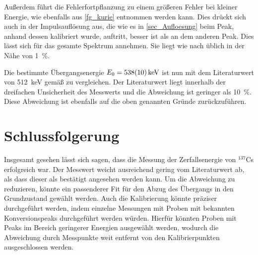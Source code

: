 \documentclass[
	a4paper,
	12pt,
	pagesize,
	ngerman
]{scrartcl}
\begin{document}
	Außerdem führt die Fehlerfortpflanzung zu einem größeren Fehler bei kleiner Energie, wie ebenfalls aus \cref{fg_kurie} entnommen werden kann.
	Dies drückt sich auch in der Impulsauflösung aus, die wie es in \cref{sec_Aufloesung} beim Peak, anhand dessen kalibriert wurde, auftritt, besser ist als an dem anderen Peak.
	Dies lässt sich für das gesamte Spektrum annehmen.
	Sie liegt wie nach \cite{Anleitung} üblich in der Nähe von \SI{1}{\percent}.

	Die bestimmte Übergangsenergie $E_0=\SI{538+-10}{keV}$ ist nun mit dem Literaturwert von \SI{512}{keV} gemäß \cite{Leifi} zu vergleichen.
	Der Literaturwert liegt innerhalb der dreifachen Unsicherheit des Messwerts und die Abweichung ist geringer als \SI{10}{\percent}.
	Diese Abweichung ist ebenfalls auf die oben genannten Gründe zurückzuführen.



	\section{Schlussfolgerung}
	Insgesamt gesehen lässt sich sagen, dass die Messung der Zerfallsenergie von $^{137}$Cs erfolgreich war.
	Der Messwert weicht ausreichend gering vom Literaturwert ab, als dass dieser als bestätigt angesehen werden kann.
	Um die Abweichung zu reduzieren, könnte ein passenderer Fit für den Abzug des Übergangs in den Grundzustand gewählt werden.
	Auch die Kalibrierung könnte präziser durchgeführt werden, indem einzelne Messungen mit Proben mit bekannten Konversionspeaks durchgeführt werden würden.
	Hierfür könnten Proben mit Peaks im Bereich geringerer Energien ausgewählt werden, wodurch die Abweichung durch Messpunkte weit entfernt von den Kalibrierpunkten ausgeschlossen werden.

	\printbibliography
\end{document}
